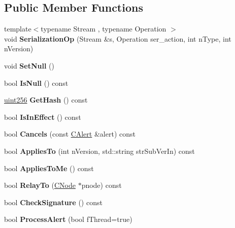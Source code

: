 \subsection*{Public Member Functions}
\begin{DoxyCompactItemize}
\item 
\mbox{\label{class_c_alert_a51d73ab316bb42e65b87ec14ac536b14}} 
{\footnotesize template$<$typename Stream , typename Operation $>$ }\\void {\bfseries Serialization\+Op} (Stream \&s, Operation ser\+\_\+action, int n\+Type, int n\+Version)
\item 
\mbox{\label{class_c_alert_a93fd881c55ab448213787f49e316eb99}} 
void {\bfseries Set\+Null} ()
\item 
\mbox{\label{class_c_alert_a9c728b7fe91e74c51116a23b07d6978a}} 
bool {\bfseries Is\+Null} () const
\item 
\mbox{\label{class_c_alert_a059c136c9556e5e59a1a4dc39a97366d}} 
\mbox{\hyperlink{classuint256}{uint256}} {\bfseries Get\+Hash} () const
\item 
\mbox{\label{class_c_alert_a018da40779a5c095c38bf10f4256cee6}} 
bool {\bfseries Is\+In\+Effect} () const
\item 
\mbox{\label{class_c_alert_a75777afd3418c6cd74f7e9e4caed3472}} 
bool {\bfseries Cancels} (const \mbox{\hyperlink{class_c_alert}{C\+Alert}} \&alert) const
\item 
\mbox{\label{class_c_alert_a75a0fea5dc20ad704d10496f2ef0d419}} 
bool {\bfseries Applies\+To} (int n\+Version, std\+::string str\+Sub\+Ver\+In) const
\item 
\mbox{\label{class_c_alert_aba79cc9e957446fe93f05cb18f12b24b}} 
bool {\bfseries Applies\+To\+Me} () const
\item 
\mbox{\label{class_c_alert_a21a801f1a5978889722771d4eb13bf37}} 
bool {\bfseries Relay\+To} (\mbox{\hyperlink{class_c_node}{C\+Node}} $\ast$pnode) const
\item 
\mbox{\label{class_c_alert_a862d9fb7ebdfc0483b30862d2a75d527}} 
bool {\bfseries Check\+Signature} () const
\item 
\mbox{\label{class_c_alert_af3e6b2e5d3584f58c5d7be9dbd72b4cc}} 
bool {\bfseries Process\+Alert} (bool f\+Thread=true)
\end{DoxyCompactItemize}
